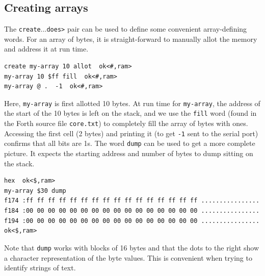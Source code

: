 \documentclass[12pt,a4paper]{article}
\begin{document}
\subsection{Creating arrays}
\label{sec:creating-arrays}
%
The \verb!create!...\verb!does>! pair can be used to define some convenient 
array-defining words.
For an array of bytes, it is straight-forward to manually allot the
memory and address it at run time.
\begin{verbatim}
create my-array 10 allot  ok<#,ram>
my-array 10 $ff fill  ok<#,ram>
my-array @ .  -1  ok<#,ram>
\end{verbatim}
Here, \verb!my-array! is first allotted 10 bytes.
At run time for \verb!my-array!, the address of the start of the 10 bytes is left on 
the stack, and we use the \verb!fill! word (found in the Forth source file \verb!core.txt!) 
to completely fill the array of bytes with ones.
Accessing the first cell (2 bytes) and printing it (to get \verb!-1! sent to the serial port)
confirms that all bits are 1s.
The word \verb!dump! can be used to get a more complete picture.
It expects the starting address and number of bytes to dump sitting on the stack.
\begin{verbatim}
hex  ok<$,ram>
my-array $30 dump 
f174 :ff ff ff ff ff ff ff ff ff ff ff ff ff ff ff ff ................
f184 :00 00 00 00 00 00 00 00 00 00 00 00 00 00 00 00 ................
f194 :00 00 00 00 00 00 00 00 00 00 00 00 00 00 00 00 ................ ok<$,ram>
\end{verbatim}
Note that \verb!dump! works with blocks of 16 bytes and that the dots to the right
show a character representation of the byte values.
This is convenient when trying to identify strings of text.
\end{document}
